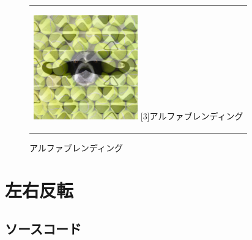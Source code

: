 \documentclass[a4paper,11pt,titlepage]{bxjsarticle}
\begin{document}
\begin{figure}[htbp]
\begin{center}
\begin{tabular}{c}
      \begin{minipage}{0.33\hsize}
        \begin{center}
          \includegraphics[clip, width=4.5cm]{./abdst.jpg}
          \hspace{1.6cm} [3]アルファブレンディング
        \end{center}
      \end{minipage}

    \end{tabular}
    \caption{アルファブレンディング}
    \label{fig:lena}
  \end{center}
\end{figure}

\section{左右反転}
\subsection{ソースコード}

\end{document}
